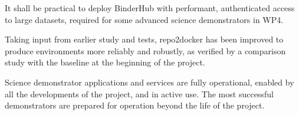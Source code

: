 \begin{milestones}
  {
  It shall be practical to deploy BinderHub with performant, authenticated access to large datasets,
  required for some advanced science demonstrators in WP4.
  }

  {
  Taking input from earlier study and tests,
  repo2docker has been improved to produce environments more reliably and robustly,
  as verified by a comparison study with the baseline at the beginning of the project.
  }

  {
  Science demonstrator applications and services are fully operational,
  enabled by all the developments of the project,
  and in active use.
  The most successful demonstrators are prepared for operation beyond the life of the project.
  }

\end{milestones}

\milestonetable
